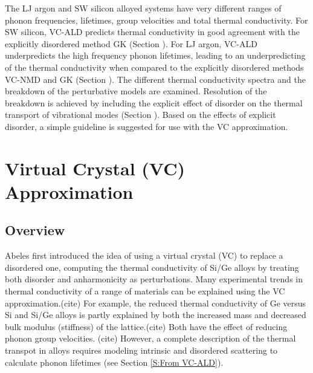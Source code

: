 \documentclass[aps,prb,twocolumn,superscriptaddress,amsmath,amssymb,floatfix]{revtex4}
\begin{document}
The LJ argon and SW silicon alloyed 
systems have very different ranges of phonon frequencies, 
lifetimes, group velocities and total thermal conductivity. 
For SW silicon, 
VC-ALD predicts thermal conductivity in good agreement with the 
explicitly disordered method GK (Section ). 
For LJ argon, VC-ALD underpredicts 
the high frequency phonon lifetimes, leading to an underpredicting of 
the thermal conductivity when compared to the explicitly disordered 
methods VC-NMD and GK (Section ). 
The different thermal conductivity spectra  
and the breakdown of the perturbative models are examined. Resolution 
of the breakdown is achieved by including the explicit effect of
disorder on the thermal transport of vibrational modes (Section ). Based 
on the effects of explicit disorder, a simple guideline is suggested 
for use with the VC approximation.

\section{\label{S:Virtual Crystal}Virtual Crystal (VC) Approximation}

\subsection{\label{S:Overview}Overview}

Abeles first introduced the idea of using a virtual crystal (VC) to 
replace a disordered one, computing the
thermal conductivity of Si/Ge alloys by treating both
disorder and anharmonicity as perturbations.\cite{abeles_lattice_1963} 
Many experimental trends in thermal conductivity 
of a range of materials 
can be explained using the VC approximation.(cite) For example,
the reduced thermal conductivity of Ge versus Si and Si/Ge alloys 
is partly explained 
by both the increased mass and decreased bulk modulus (stiffness) of the 
lattice.(cite) Both have the effect of reducing phonon group velocities.
(cite) However, a complete 
description of the thermal transpot in alloys requires modeling intrinsic 
and disordered scattering to calculate phonon lifetimes 
(see Section \ref{S:From VC-ALD}).
\end{document}

